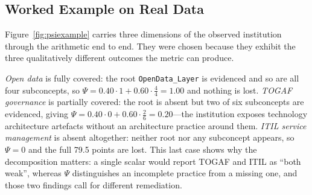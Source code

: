 \documentclass[engproc,article,submit,moreauthors]{Definitions/mdpi}
\begin{document}
\subsection{Worked Example on Real Data}
Figure~\ref{fig:psiexample} carries three dimensions of the observed institution through the arithmetic end to end. They were chosen because they exhibit the three qualitatively different outcomes the metric can produce.

\emph{Open data} is fully covered: the root \texttt{OpenData\_Layer} is evidenced and so are all four subconcepts, so $\Psi=0.40\cdot 1+0.60\cdot\frac{4}{4}=1.00$ and nothing is lost. \emph{TOGAF governance} is partially covered: the root is absent but two of six subconcepts are evidenced, giving $\Psi=0.40\cdot 0+0.60\cdot\frac{2}{6}=0.20$---the institution exposes technology architecture artefacts without an architecture practice around them. \emph{ITIL service management} is absent altogether: neither root nor any subconcept appears, so $\Psi=0$ and the full 79.5 points are lost. This last case shows why the decomposition matters: a single scalar would report TOGAF and ITIL as ``both weak'', whereas $\Psi$ distinguishes an incomplete practice from a missing one, and those two findings call for different remediation.
\end{document}
